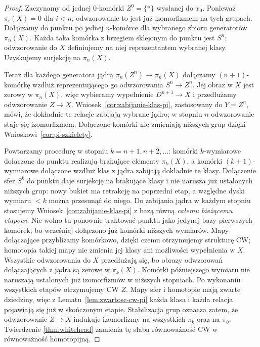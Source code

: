 \documentclass[11pt,a4paper,oneside]{report}
\theoremstyle{plain}
\theoremstyle{definition}
\theoremstyle{remark}
\begin{document}
\begin{proof}
Zaczynamy od jednej
$0$-komórki $Z^0=\{*\}$
wysłanej do $x_0$.
Ponieważ $\pi_i(X)=0$
dla $i<n$, odwzorowanie to
jest już izomorfizmem
na tych grupach.
Dołączamy do punktu
po jednej $n$-komórce
dla wybranego zbioru
generatorów $\pi_n(X)$.
Każda taka komórka
z brzegiem sklejonym
do punktu jest $S^n$;
odwzorowanie do $X$ definiujemy
na niej reprezentantem
wybranej klasy.
Uzyskujemy surjekcję
na $\pi_n(X)$.

Teraz dla każdego
generatora jądra
$\pi_n(Z^n)\to\pi_n(X)$
dołączamy $(n+1)$-komórkę
wzdłuż reprezentującego
go odwzorowania $S^n\to Z^n$.
Jej obraz w $X$
jest zerowy w $\pi_n(X)$,
więc wybieramy
wypełnienie $D^{n+1}\to X$
i przedłużamy odwzorowanie
$Z\to X$.
Wniosek~\ref{cor:zabijanie-klas-pi}, zastosowany do $Y=Z^n$,
mówi, że dokładnie te relacje zabijają wybrane jądro; w
stopniu $n$ odwzorowanie
staje się izomorfizmem.
Dołączone komórki
nie zmieniają niższych
grup dzięki
Wnioskowi~\ref{cor:pi-szkielety}.

Powtarzamy procedurę
w stopniu $k=n+1,n+2,\ldots$:
komórki $k$-wymiarowe
dołączone do punktu
realizują brakujące
elementy $\pi_k(X)$,
a komórki $(k+1)$-wymiarowe
dołączone wzdłuż klas
z jądra zabijają
dokładnie te klasy.
Dołączenie sfer $S^k$ do punktu daje surjekcję na brakujące klasy
i nie narusza już ustalonych niższych grup: nowy bukiet ma retrakcję
na poprzedni etap, a względne dyski wymiaru $<k$ można przesunąć do niego.
Do zabijania jądra w każdym stopniu stosujemy
Wniosek~\ref{cor:zabijanie-klas-pi} z bazą równą \emph{całemu bieżącemu etapowi}.
Nie wolno tu ponownie traktować punktu jako jedynej bazy pierwszych komórek,
bo wcześniej dołączono już komórki niższych wymiarów.
Mapy dołączające przybliżamy komórkowo, dzięki czemu otrzymujemy strukturę CW;
homotopia takiej mapy nie zmienia jej klasy ani możliwości wypełnienia w $X$.
Wszystkie odwzorowania do $X$ przedłużają się,
bo obrazy odwzorowań
dołączających z jądra
są zerowe w $\pi_k(X)$.
Komórki późniejszego
wymiaru nie naruszają
ustalonych już
izomorfizmów w
niższych stopniach.
Po wykonaniu
wszystkich etapów otrzymujemy CW $Z$.
Mapy sfer i homotopie mają zwarte dziedziny, więc z Lematu~\ref{lem:zwartosc-cw-pi}
każda klasa i każda relacja pojawiają się już w skończonym etapie.
Stabilizacja grup oznacza zatem, że odwzorowanie $Z\to X$
indukuje izomorfizmy
na wszystkich
$\pi_k$ oraz na
$\pi_0$. Twierdzenie
\ref{thm:whitehead}
zamienia tę słabą
równoważność CW
w równoważność
homotopijną.
\end{proof}
\end{document}

